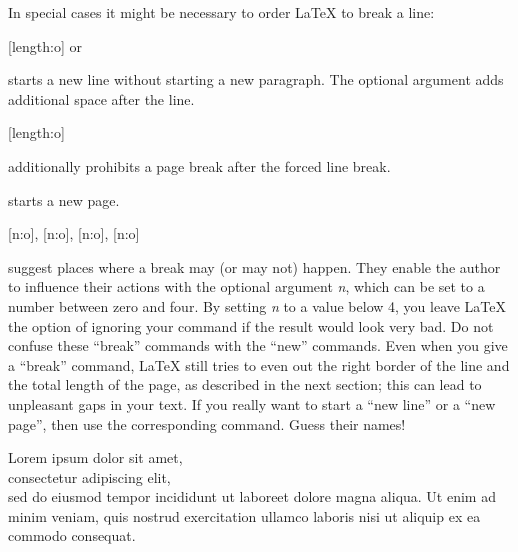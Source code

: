In special cases it might be necessary to order \LaTeX{} to break a
line:
\begin{lscommand}
  \ci*{\bs}[length:o] or 
\end{lscommand}
starts a new line without starting a new paragraph. The optional 
argument adds additional space after the line.

\begin{lscommand}
  \ci*{\bs*}[length:o]
\end{lscommand}
additionally prohibits a page break after the forced line break.

\begin{lscommand}
\end{lscommand}
starts a new page.

\begin{lscommand}
  [n:o],
  [n:o],
  [n:o],
  [n:o]
\end{lscommand}
suggest places where a break may (or may not) happen.
They enable the author to influence their
actions with the optional argument \emph{n}, which can be set to a number
between zero and four. By setting \emph{n} to a value below 4, you leave
\LaTeX{} the option of ignoring your command if the result would look very
bad. Do not confuse these ``break'' commands with the ``new'' commands. Even
when you give a ``break'' command, \LaTeX{} still tries to even out the
right border of the line and the total length of the page, as described in
the next section; this can lead to unpleasant gaps in your text.
If you really want to start a ``new line'' or a ``new page'', then use the
corresponding command. Guess their names!
\begin{example}[examplewidth=0.4\linewidth]
  Lorem ipsum dolor sit amet,\\
  consectetur adipiscing elit,\\[1cm]
  sed do eiusmod tempor\linebreak
  incididunt ut labore\linebreak[1]
  et dolore magna aliqua. Ut enim
  ad minim veniam, quis \linebreak[3]
  nostrud exercitation ullamco laboris
  nisi ut aliquip\linebreak
   ex ea commodo consequat. 
\end{example}

